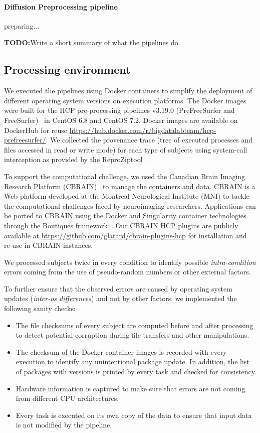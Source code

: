 \documentclass{article}
\newcommand{\todo}[1]{\color{red}\textbf{TODO:}#1\color{black}}
\newcommand{\reprozip}[0]{ReproZip}
\begin{document}
\paragraph{Diffusion Preprocessing pipeline} preparing...

\todo{Write a short summary of what the pipelines do.}

\subsection{Processing environment}

We executed the pipelines using Docker
containers to simplify the deployment of different operating
system versions on execution platforms. The Docker images were built for the HCP
 pre-processing pipelines v3.19.0 (PreFreeSurfer and
FreeSurfer)~\cite{Glasser2013} in CentOS 6.8 and CentOS 7.2. Docker images are available on DockerHub for reuse \url{https://hub.docker.com/r/bigdatalabteam/hcp-prefreesurfer/}. We
collected the provenance trace (tree of executed processes and files
accessed in read or write mode) for each type of subjects using system-call
interception as provided by the \reprozip tool~\cite{Chirigati2016}.



To support the computational challenge, we used the Canadian Brain
Imaging Research Platform (CBRAIN)~\cite{cbrain} to manage the
containers and data. CBRAIN is a Web platform developed at the
Montreal Neurological Institute (MNI) to tackle the computational
challenges faced by neuroimaging researchers.  Applications can be
ported to CBRAIN using the Docker and Singularity container
technologies through the Boutiques framework~\cite{boutiques}. Our
CBRAIN HCP plugins are publicly available at \url{https://github.com/glatard/cbrain-plugins-hcp} for
installation and re-use in CBRAIN instances.

We processed subjects twice in every condition to identify possible \emph{intra-condition} errors coming from the use of pseudo-random numbers or other external
factors. 

To further ensure that the observed errors are caused by operating system
updates (\emph{inter-os differences}) and not by other factors, we
implemented the following sanity checks:
\begin{itemize}
\item The file checksums of every
subject are computed before and after processing to detect potential corruption during file transfers and other manipulations.
\item The checksum of the Docker container images is recorded with
  every execution to identify any unintentional package update. In
  addition, the list of packages with versions is printed by every
  task and checked for consistency.
\item Hardware information is captured to make sure that errors are
  not coming from different CPU architectures.
\item Every task is executed on its own copy of the data to ensure
  that input data is not modified by the pipeline. 
\end{itemize}
\end{document}
